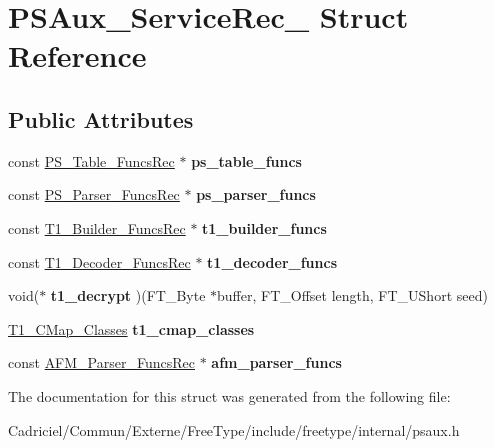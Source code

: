 \hypertarget{struct_p_s_aux___service_rec__}{}\section{P\+S\+Aux\+\_\+\+Service\+Rec\+\_\+ Struct Reference}
\label{struct_p_s_aux___service_rec__}
\subsection*{Public Attributes}
\begin{DoxyCompactItemize}
\item 
const \hyperlink{struct_p_s___table___funcs_rec__}{P\+S\+\_\+\+Table\+\_\+\+Funcs\+Rec} $\ast$ {\bfseries ps\+\_\+table\+\_\+funcs}\hypertarget{struct_p_s_aux___service_rec___ad328bf7394cad5b2838822aa109acc42}{}\label{struct_p_s_aux___service_rec___ad328bf7394cad5b2838822aa109acc42}

\item 
const \hyperlink{struct_p_s___parser___funcs_rec__}{P\+S\+\_\+\+Parser\+\_\+\+Funcs\+Rec} $\ast$ {\bfseries ps\+\_\+parser\+\_\+funcs}\hypertarget{struct_p_s_aux___service_rec___ac673695e814332b38fd33c7f0287a4b7}{}\label{struct_p_s_aux___service_rec___ac673695e814332b38fd33c7f0287a4b7}

\item 
const \hyperlink{struct_t1___builder___funcs_rec__}{T1\+\_\+\+Builder\+\_\+\+Funcs\+Rec} $\ast$ {\bfseries t1\+\_\+builder\+\_\+funcs}\hypertarget{struct_p_s_aux___service_rec___a3fe7449b123d0fb6f7ba92462c4e94c1}{}\label{struct_p_s_aux___service_rec___a3fe7449b123d0fb6f7ba92462c4e94c1}

\item 
const \hyperlink{struct_t1___decoder___funcs_rec__}{T1\+\_\+\+Decoder\+\_\+\+Funcs\+Rec} $\ast$ {\bfseries t1\+\_\+decoder\+\_\+funcs}\hypertarget{struct_p_s_aux___service_rec___a5cfe03f55fa4c342a094fd31355835b2}{}\label{struct_p_s_aux___service_rec___a5cfe03f55fa4c342a094fd31355835b2}

\item 
void($\ast$ {\bfseries t1\+\_\+decrypt} )(F\+T\+\_\+\+Byte $\ast$buffer, F\+T\+\_\+\+Offset length, F\+T\+\_\+\+U\+Short seed)\hypertarget{struct_p_s_aux___service_rec___a8f56c369db4df9268b255dba29aadc9f}{}\label{struct_p_s_aux___service_rec___a8f56c369db4df9268b255dba29aadc9f}

\item 
\hyperlink{struct_t1___c_map___classes_rec__}{T1\+\_\+\+C\+Map\+\_\+\+Classes} {\bfseries t1\+\_\+cmap\+\_\+classes}\hypertarget{struct_p_s_aux___service_rec___a4ac30b929dcc6127200baea07b5b406a}{}\label{struct_p_s_aux___service_rec___a4ac30b929dcc6127200baea07b5b406a}

\item 
const \hyperlink{struct_a_f_m___parser___funcs_rec__}{A\+F\+M\+\_\+\+Parser\+\_\+\+Funcs\+Rec} $\ast$ {\bfseries afm\+\_\+parser\+\_\+funcs}\hypertarget{struct_p_s_aux___service_rec___a9ddf18cc18487266a3e1dd7721fd12fb}{}\label{struct_p_s_aux___service_rec___a9ddf18cc18487266a3e1dd7721fd12fb}

\end{DoxyCompactItemize}


The documentation for this struct was generated from the following file\+:\begin{DoxyCompactItemize}
\item 
Cadriciel/\+Commun/\+Externe/\+Free\+Type/include/freetype/internal/psaux.\+h\end{DoxyCompactItemize}
